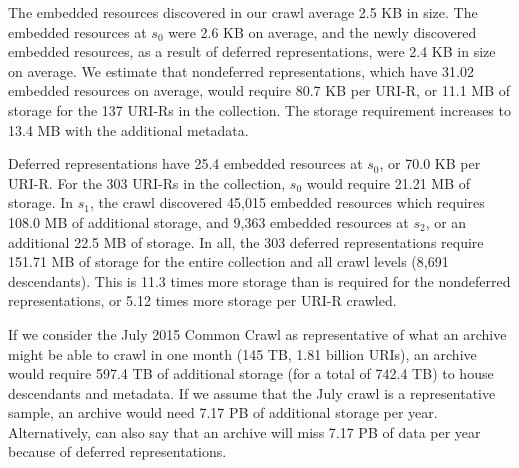 \documentclass{sig-alternate}
\begin{document}
The embedded resources discovered in our crawl average 2.5 KB in size. The embedded resources at $s_0$ were 2.6 KB on average, and the newly discovered embedded resources, as a result of deferred representations, were 2.4 KB in size on average. We estimate that nondeferred representations, which have 31.02 embedded resources on average, would require 80.7 KB per URI-R, or 11.1 MB of storage for the 137 URI-Rs in the collection. The storage requirement increases to 13.4 MB with the additional metadata.

Deferred representations have 25.4 embedded resources at $s_0$, or 70.0 KB per URI-R. For the 303 URI-Rs in the collection, $s_0$ would require 21.21 MB of storage. In $s_1$, the crawl discovered 45,015 embedded resources which requires 108.0 MB of additional storage, and 9,363 embedded resources at $s_2$, or an additional 22.5 MB of storage. In all, the 303 deferred representations require 151.71 MB of storage for the entire collection and all crawl levels (8,691 descendants). This is 11.3 times more storage than is required for the nondeferred representations, or 5.12 times more storage per URI-R crawled. 

If we consider the July 2015 Common Crawl \cite{iaSize} as representative of what an archive might be able to crawl in one month (145 TB, 1.81 billion URIs), an archive would require 597.4 TB of additional storage (for a total of 742.4 TB) to house descendants and metadata. If we assume that the July crawl is a representative sample, an archive would need 7.17 PB of additional storage per year. Alternatively, can also say that an archive will miss 7.17 PB of data per year because of deferred representations.
\end{document}

